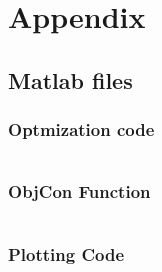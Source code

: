 \documentclass{article}
\begin{document}
\section{Appendix}

\subsection{Matlab files}
\subsubsection{Optmization code}
\inputminted[xleftmargin=20pt,linenos]{matlab}{Opt.m}
\subsubsection{ObjCon Function}
\inputminted[xleftmargin=20pt,linenos]{matlab}{objcon.m}
\subsubsection{Plotting Code}
\inputminted[xleftmargin=20pt,linenos]{matlab}{contourPlot.m}


\end{document}
